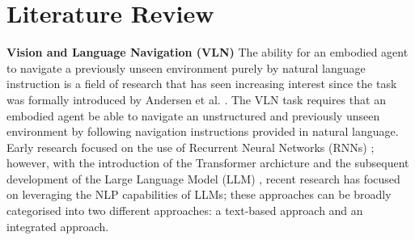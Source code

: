\documentclass{svproc}
\begin{document}
\section{Literature Review}
    \textbf{Vision and Language Navigation (VLN)}  The ability for an embodied agent to navigate a previously unseen environment purely by natural language instruction is a field of research that has seen increasing interest since the task was formally introduced by Andersen et al. \cite{8578485}. The VLN task requires that an embodied agent be able to navigate an unstructured and previously unseen environment by following navigation instructions provided in natural language. Early research focused on the use of Recurrent Neural Networks (RNNs) \cite{8578485, 8954045, 8953608, li2019robustnavigationlanguagepretraining}; however, with the introduction of the Transformer archicture \cite{attenion_is_all_you_need} and the subsequent development of the Large Language Model (LLM) \cite{radford2018improving, touvron2023llamaopenefficientfoundation}, recent research has focused on leveraging the NLP capabilities of LLMs; these approaches can be broadly categorised into two different approaches: a text-based approach and an integrated approach.
    \\ \\
\end{document}
